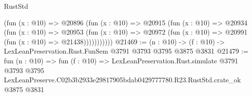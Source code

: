 \begin{lexlean}{RustStd}
\begin{coremodule}
            (fun (x : @10) =>
            @20896
              (fun (x : @10) =>
              @20915
                (fun (x : @10) =>
                @20934
                  (fun (x : @10) =>
                  @20953
                    (fun (x : @10) =>
                    @20972 (fun (x : @10) => @20991 (fun (x : @10) => @21438)))))))))))
@21469 := (n : @10) -> (f : @10) -> LexLeanPreservation.Rust.FunSem @3791 @3793 @3795 @3875 @3831
@21479 := fun (n : @10) =>
  fun (f : @10) =>
  LexLeanPreservation.Rust.simulate
    @3791
    @3793
    @3795
    LexLeanPreserve.C02b3b2933e29817905bdab0429777780.R23.RustStd.crate_ok
    @3875
    @3831
\end{coremodule}
\end{lexlean}
